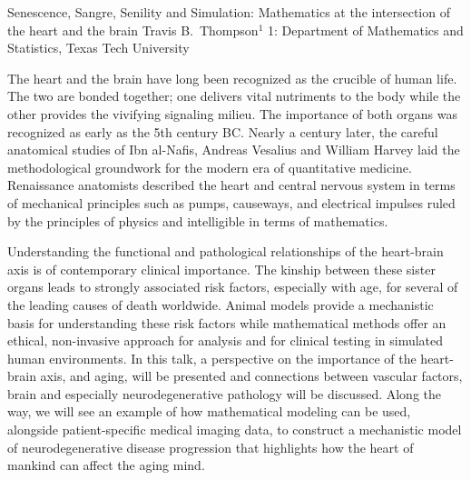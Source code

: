 \begin{addmargin}[2em]{0em}
\vspace{2ex}
\abs
{Senescence, Sangre, Senility and Simulation: Mathematics at the intersection of the heart and the brain}
{Travis B.~Thompson$^{1}$}
{1: Department of Mathematics and Statistics, Texas Tech University}
{The heart and the brain have long been recognized as the crucible of human life.  The two are bonded together; one delivers vital nutriments to the body while the other provides the vivifying signaling milieu.   The importance of both organs was recognized as early as the 5th century BC.  Nearly a century later, the careful anatomical studies of Ibn al-Nafis, Andreas Vesalius and William Harvey laid the methodological groundwork for the modern era of quantitative medicine.  Renaissance anatomists described the heart and central nervous system in terms of mechanical principles such as pumps, causeways, and electrical impulses ruled by the principles of physics and intelligible in terms of mathematics.

Understanding the functional and pathological relationships of the heart-brain axis is of contemporary clinical importance.  The kinship between these sister organs leads to strongly associated risk factors, especially with age, for several of the leading causes of death worldwide.  Animal models provide a mechanistic basis for understanding these risk factors while mathematical methods offer an ethical, non-invasive approach for analysis and for clinical testing in simulated human environments.
In this talk, a perspective on the importance of the heart-brain axis, and aging, will be presented and connections between vascular factors, brain and especially neurodegenerative pathology will be discussed.  Along the way, we will see an example of how mathematical modeling can be used, alongside patient-specific medical imaging data, to construct a mechanistic model of neurodegenerative disease progression that highlights how the heart of mankind can affect the aging mind.}



\end{addmargin}

